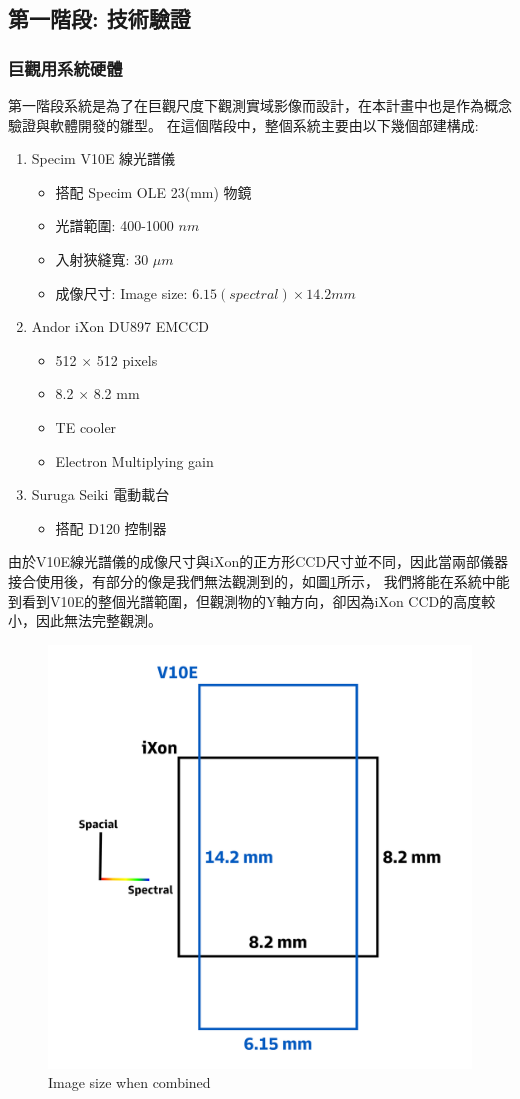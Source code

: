 \documentclass[12pt]{article}
\begin{document}
    \subsection{第一階段: 技術驗證}
    \subsubsection{巨觀用系統硬體}
    第一階段系統是為了在巨觀尺度下觀測實域影像而設計，在本計畫中也是作為概念驗證與軟體開發的雛型。
    在這個階段中，整個系統主要由以下幾個部建構成:
    \begin{enumerate}
        \item Specim V10E 線光譜儀
                \begin{itemize}
                    \item 搭配 Specim OLE 23(mm) 物鏡
                    \item 光譜範圍: 400-1000 $nm$
                    \item 入射狹縫寬: 30 $\mu m$
                    \item 成像尺寸: Image size: $6.15(spectral) \times 14.2 mm$
                \end{itemize}
        \item Andor iXon DU897 EMCCD
            \begin{itemize}
                \item 512 $\times$ 512 pixels
                \item 8.2 $\times$ 8.2 mm
                \item TE cooler
                \item Electron Multiplying gain
            \end{itemize}  
        \item Suruga Seiki 電動載台
                \begin{itemize}
                    \item 搭配 D120 控制器
                \end{itemize}
    \end{enumerate}
    由於V10E線光譜儀的成像尺寸與iXon的正方形CCD尺寸並不同，因此當兩部儀器接合使用後，有部分的像是我們無法觀測到的，如圖\ref{figure: image size}所示，
    我們將能在系統中能到看到V10E的整個光譜範圍，但觀測物的Y軸方向，卻因為iXon CCD的高度較小，因此無法完整觀測。

    \begin{figure}[t]
        \centering
        \includegraphics[width=0.5\linewidth]{imagesize.jpg}
        \caption{Image size when combined}
        \label{figure: image size}
    \end{figure}
\end{document}
